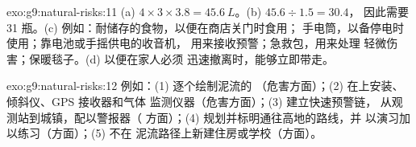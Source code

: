 \begin{solution}{exo:g9:natural-risks:11}
(a) $4 \times 3 \times 3.8 = \qty{45.6}{L}$。(b) $45.6 \div 1.5 = 30.4$，
因此需要 31 瓶。(c) 例如：耐储存的食物，以便在商店关门时食用；
手电筒，以备停电时使用；靠电池或手摇供电的收音机，
用来接收预警；急救包，用来处理
轻微伤害；保暖毯子。(d) 以便在家人必须
迅速撤离时，能够立即带走。
\end{solution}

\begin{solution}{exo:g9:natural-risks:12}
例如：(1) 逐个绘制泥流的
（危害方面）；(2) 在上安装、倾斜仪、GPS 接收器和气体
监测仪器（危害方面）；(3) 建立快速预警链，
从观测站到城镇，配以警报器（
方面）；(4) 规划并标明通往高地的路线，并
以演习加以练习（方面）；(5) 不在
泥流路径上新建住房或学校（方面）。
\end{solution}

